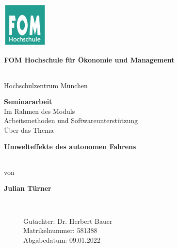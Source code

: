 \newcommand{\Thema}{Umwelteffekte des autonomen Fahrens}
\newcommand{\Name}{Julian Türner}
\newcommand{\Gutachter}{Dr. Herbert Bauer}
\newcommand{\Matrikelnummer}{581388}
\newcommand{\Abgabedatum}{09.01.2022}




\begin{titlepage}
	\begin{center}
		\includegraphics[width=2.3cm]{assets/fomLogo.pdf}\\
		\vspace{.5cm}
		\begin{Large}\textbf{FOM Hochschule für Ökonomie und Management}\end{Large}\\
		\vspace{.5cm}
		Hochschulzentrum München

		\vspace{2cm}
	\end{center}

	\bigskip

	\begin{center}
		\textbf{Seminararbeit}\\
		\vspace{0.2cm}
		Im Rahmen des Moduls\\
		\vspace{0.5cm}
		Arbeitsmethoden und Softwareunterstützung\\
		\vspace{2cm}
		Über das Thema\\
		\vspace{0.5cm}
		\begin{Large}\textbf{\textbf{\Thema}}\end{Large}\\

		\vspace{2cm}
		von\\
		\vspace{0.5cm}
		\begin{Large}\textbf{\textbf{\Name}}\end{Large}\\
	\end{center}

	\begin{figure}[b]

		Gutachter: \Gutachter       \\
		Matrikelnummer: \Matrikelnummer \\
		Abgabedatum: \Abgabedatum
	\end{figure}

\end{titlepage}
